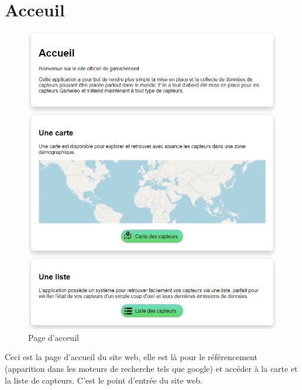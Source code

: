 \section{Acceuil}\label{sec:page-d-acceuil}

    \begin{figure}[H]
        \begin{center}
            \includegraphics[width=12cm]{resources/home}
        \end{center}
        \caption{Page d'acceuil}\label{fig:page-d-acceuil}
    \end{figure}

    Ceci est la page d'accueil du site web, elle est là pour le référencement
    (apparition dans les moteurs de recherche tels que google) et accéder à la carte et la liste de capteurs.
    C'est le point d'entrée du site web.
